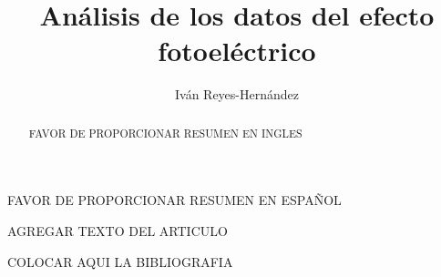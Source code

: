 \documentclass[spanish]{rmf-d}
\begin{document}
\title{Análisis de los datos del efecto fotoeléctrico
\vspace{-6pt}}

\author{Iván Reyes-Hernández}

\address{Facultad de Ciencias, Universidad Nacional Autónoma de México,\\
Ciudad de México, México. \\
e-mail: ivanreyes@ciencias.unam.mx}

\maketitle


\begin{resumen}

\vspace{1em} FAVOR DE PROPORCIONAR RESUMEN EN ESPAÑOL\vspace{1em}

\end{resumen}


\begin{abstract}

\vspace{1em} FAVOR DE PROPORCIONAR RESUMEN EN INGLES\vspace{1em}

\end{abstract}


\begin{multicols}{2}

AGREGAR  TEXTO DEL ARTICULO


\end{multicols}
\medline

\begin{multicols}{2}
\begin{thebibliography}{99}

 COLOCAR AQUI LA BIBLIOGRAFIA


\end{thebibliography}

\end{multicols}
\end{document}

